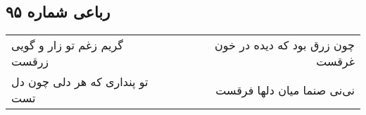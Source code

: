 \begin{center}
\section*{رباعی شماره ۹۵}
\label{sec:sh095}
\begin{longtable}{l p{0.5cm} r}
گریم زغم تو زار و گویی زرقست
&&
چون زرق بود که دیده در خون غرقست
\\
تو پنداری که هر دلی چون دل تست
&&
نی‌نی صنما میان دلها فرقست
\\
\end{longtable}
\end{center}
